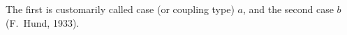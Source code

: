 The first is customarily called case (or coupling type) $a$, and the second case $b$ (F.~Hund, 1933).
